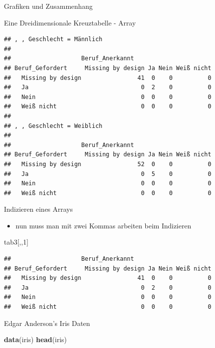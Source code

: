 \documentclass[ignorenonframetext,]{beamer}
\newenvironment{Shaded}{}{}
\newcommand{\KeywordTok}[1]{\textcolor[rgb]{0.00,0.44,0.13}{\textbf{{#1}}}}
\newcommand{\DecValTok}[1]{\textcolor[rgb]{0.25,0.63,0.44}{{#1}}}
\newcommand{\NormalTok}[1]{{#1}}
\providecommand{\tightlist}{%
\setlength{\itemsep}{0pt}\setlength{\parskip}{0pt}}
\begin{document}
\begin{frame}[fragile]{Grafiken und Zusammenhang}
\begin{block}{Eine Dreidimensionale Kreuztabelle - Array}
\begin{verbatim}
## , , Geschlecht = Männlich
## 
##                    Beruf_Anerkannt
## Beruf_Gefordert     Missing by design Ja Nein Weiß nicht
##   Missing by design                41  0    0          0
##   Ja                                0  2    0          0
##   Nein                              0  0    0          0
##   Weiß nicht                        0  0    0          0
## 
## , , Geschlecht = Weiblich
## 
##                    Beruf_Anerkannt
## Beruf_Gefordert     Missing by design Ja Nein Weiß nicht
##   Missing by design                52  0    0          0
##   Ja                                0  5    0          0
##   Nein                              0  0    0          0
##   Weiß nicht                        0  0    0          0
\end{verbatim}

\end{block}

\begin{block}{Indizieren eines Arrays}

\begin{itemize}
\tightlist
\item
  nun muss man mit zwei Kommas arbeiten beim Indizieren
\end{itemize}

\begin{Shaded}
\begin{Highlighting}[]
\NormalTok{tab3[,,}\DecValTok{1}\NormalTok{]}
\end{Highlighting}
\end{Shaded}

\begin{verbatim}
##                    Beruf_Anerkannt
## Beruf_Gefordert     Missing by design Ja Nein Weiß nicht
##   Missing by design                41  0    0          0
##   Ja                                0  2    0          0
##   Nein                              0  0    0          0
##   Weiß nicht                        0  0    0          0
\end{verbatim}

\end{block}

\begin{block}{Edgar Anderson's Iris Daten}

\begin{Shaded}
\begin{Highlighting}[]
\KeywordTok{data}\NormalTok{(iris)}
\KeywordTok{head}\NormalTok{(iris)}
\end{Highlighting}
\end{Shaded}


\end{block}
\end{frame}
\end{document}
